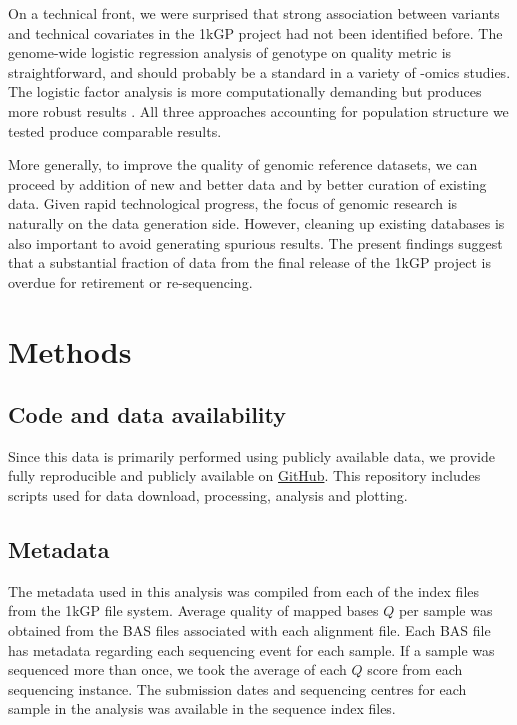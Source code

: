 \documentclass[9pt,article]{template}
\begin{document}
On a technical front, we were surprised that strong association between variants and technical covariates in the 1kGP project had not been identified before. 
The genome-wide logistic regression analysis of genotype on quality metric is straightforward, and should probably be a standard in a variety of -omics studies. 
The logistic factor analysis is more computationally demanding but produces more robust results \citep{song2015testing}. 
All three approaches accounting for population structure we tested produce comparable results.  

More generally, to improve the quality of genomic reference datasets, we can proceed by addition of new and better data and by better curation of existing data.
Given rapid technological progress, the focus of genomic research is naturally on the data generation side. 
However, cleaning up existing databases is also important to avoid generating spurious results. 
The present findings suggest that a substantial fraction of data from the final release of the 1kGP project is overdue for retirement or re-sequencing.

\section{Methods}
\subsection{Code and data availability}
Since this data is primarily performed using publicly available data, we provide fully reproducible and publicly available on \href{https://github.com/LukeAndersonTrocme/LegacyData}{GitHub}.
This repository includes scripts used for data download, processing, analysis and plotting.

\subsection{Metadata}
The metadata used in this analysis was compiled from each of the index files from the 1kGP file system. 
Average quality of mapped bases $Q$ per sample was obtained from the BAS files associated with each alignment file.
Each BAS file has metadata regarding each sequencing event for each sample. 
If a sample was sequenced more than once, we took the average of each $Q$ score from each sequencing instance. 
The submission dates and sequencing centres for each sample in the analysis was available in the sequence index files.
\end{document}

